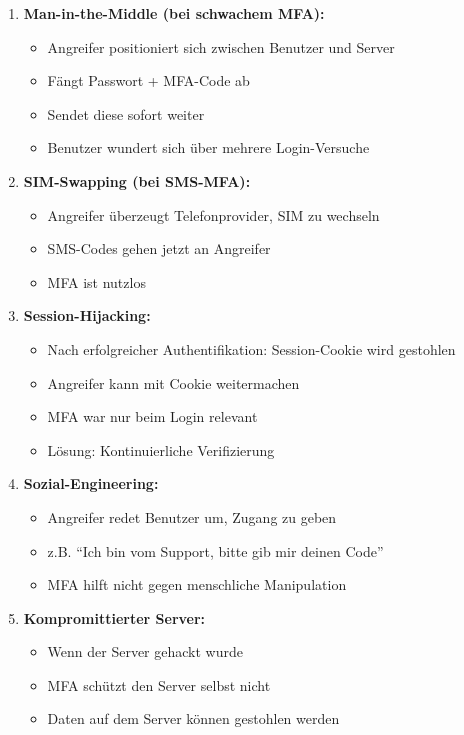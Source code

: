 \documentclass[12pt,a4paper]{article}
\begin{document}
\begin{tcolorbox}[colback=solutionbg, colframe=black!30]
    
\begin{enumerate}[3.]
    \item \textbf{Man-in-the-Middle (bei schwachem MFA):}
    \begin{itemize}
        \item Angreifer positioniert sich zwischen Benutzer und Server
        \item Fängt Passwort + MFA-Code ab
        \item Sendet diese sofort weiter
        \item Benutzer wundert sich über mehrere Login-Versuche
    \end{itemize}
    
    \item \textbf{SIM-Swapping (bei SMS-MFA):}
    \begin{itemize}
        \item Angreifer überzeugt Telefonprovider, SIM zu wechseln
        \item SMS-Codes gehen jetzt an Angreifer
        \item MFA ist nutzlos
    \end{itemize}
    
    \item \textbf{Session-Hijacking:}
    \begin{itemize}
        \item Nach erfolgreicher Authentifikation: Session-Cookie wird gestohlen
        \item Angreifer kann mit Cookie weitermachen
        \item MFA war nur beim Login relevant
        \item Lösung: Kontinuierliche Verifizierung
    \end{itemize}
    
    \item \textbf{Sozial-Engineering:}
    \begin{itemize}
        \item Angreifer redet Benutzer um, Zugang zu geben
        \item z.B. ``Ich bin vom Support, bitte gib mir deinen Code''
        \item MFA hilft nicht gegen menschliche Manipulation
    \end{itemize}
    
    \item \textbf{Kompromittierter Server:}
    \begin{itemize}
        \item Wenn der Server gehackt wurde
        \item MFA schützt den Server selbst nicht
        \item Daten auf dem Server können gestohlen werden
    \end{itemize}
\end{enumerate}


\end{tcolorbox}
\end{document}
